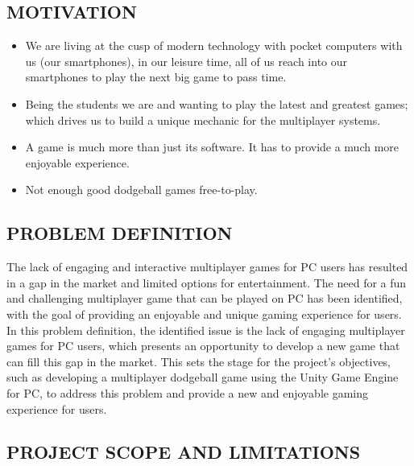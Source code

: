 \documentclass[12pt]{report}
\begin{document}
\raggedright
\subsection{MOTIVATION}

\justifying
\setlength{\parindent}{4em}
\setlength{\parskip}{0.5em}
\renewcommand{\baselinestretch}{1.5}
\normalsize\hspace{1.7cm}\begin{itemize} \item We are living at the cusp of modern technology with pocket computers with us (our smartphones), in our leisure time, all of us reach into our smartphones to play the next big game to pass time.

\item Being the students we are and wanting to play the latest and greatest games; which drives us to build a unique mechanic for the multiplayer systems.

\item A game is much more than just its software. It has to provide a much more enjoyable experience.

\item Not enough good dodgeball games free-to-play.\\
\end{itemize}
\raggedright
\subsection{PROBLEM DEFINITION}

\justifying
\setlength{\parindent}{4em}
\setlength{\parskip}{0.5em}
\renewcommand{\baselinestretch}{1.5}
\normalsize \hspace{1.7cm} The lack of engaging and interactive multiplayer games for PC users has resulted in a gap in the market and limited options for entertainment. The need for a fun and challenging multiplayer game that can be played on PC has been identified, with the goal of providing an enjoyable and unique gaming experience for users.
In this problem definition, the identified issue is the lack of engaging multiplayer games for PC users, which presents an opportunity to develop a new game that can fill this gap in the market. This sets the stage for the project's objectives, such as developing a multiplayer dodgeball game using the Unity Game Engine for PC, to address this problem and provide a new and enjoyable gaming experience for users.
\clearpage
\raggedright
\subsection{PROJECT SCOPE AND LIMITATIONS}
\end{document}
